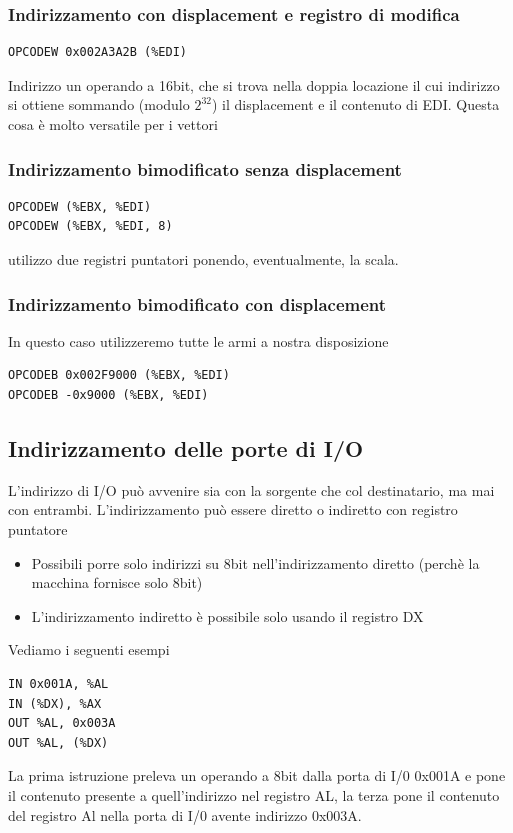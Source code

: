\documentclass[11pt]{report}
\begin{document}
\subsubsection{Indirizzamento con displacement e registro di modifica}
\begin{verbatim}
OPCODEW 0x002A3A2B (%EDI)
\end{verbatim}
Indirizzo un operando a 16bit, che si trova nella doppia locazione il cui indirizzo si ottiene sommando (modulo $2^{32}$) il displacement e il contenuto di EDI. Questa cosa è molto versatile per i vettori
\subsubsection{Indirizzamento bimodificato senza displacement}
\begin{verbatim}
OPCODEW (%EBX, %EDI)
OPCODEW (%EBX, %EDI, 8)
\end{verbatim}
utilizzo due registri puntatori ponendo, eventualmente, la scala.

\subsubsection{Indirizzamento bimodificato con displacement}
In questo caso utilizzeremo tutte le armi a nostra disposizione
\begin{verbatim}
OPCODEB 0x002F9000 (%EBX, %EDI)
OPCODEB -0x9000 (%EBX, %EDI)
\end{verbatim}

\subsection{Indirizzamento delle porte di I/O}
L'indirizzo di I/O può avvenire sia con la sorgente che col destinatario, ma mai con entrambi. L'indirizzamento può essere diretto o indiretto con registro puntatore
\begin{itemize}
\item Possibili porre solo indirizzi su 8bit nell'indirizzamento diretto (perchè la macchina fornisce solo 8bit)
\item L'indirizzamento indiretto è possibile solo usando il registro DX
\end{itemize}
Vediamo i seguenti esempi
\begin{verbatim}
IN 0x001A, %AL
IN (%DX), %AX
OUT %AL, 0x003A
OUT %AL, (%DX)
\end{verbatim}
La prima istruzione preleva un operando a 8bit dalla porta di I/0 0x001A e pone il contenuto presente a quell'indirizzo nel registro AL, la terza pone il contenuto del registro Al nella porta di I/0 avente indirizzo 0x003A.
\clearpage
\end{document}
